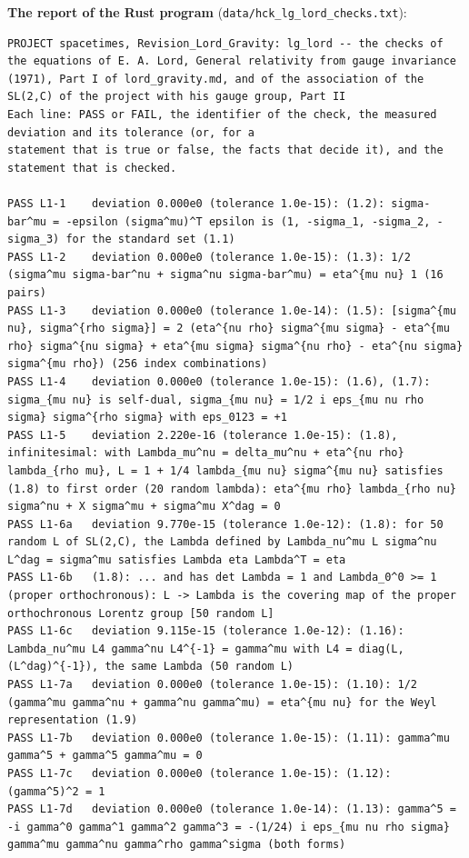 \documentclass[
  10pt,
]{article}
\begin{document}
\textbf{The report of the Rust program}
(\texttt{data/hck\_lg\_lord\_checks.txt}):

\begin{verbatim}
PROJECT spacetimes, Revision_Lord_Gravity: lg_lord -- the checks of the equations of E. A. Lord, General relativity from gauge invariance (1971), Part I of lord_gravity.md, and of the association of the SL(2,C) of the project with his gauge group, Part II
Each line: PASS or FAIL, the identifier of the check, the measured deviation and its tolerance (or, for a
statement that is true or false, the facts that decide it), and the statement that is checked.

PASS L1-1    deviation 0.000e0 (tolerance 1.0e-15): (1.2): sigma-bar^mu = -epsilon (sigma^mu)^T epsilon is (1, -sigma_1, -sigma_2, -sigma_3) for the standard set (1.1)
PASS L1-2    deviation 0.000e0 (tolerance 1.0e-15): (1.3): 1/2 (sigma^mu sigma-bar^nu + sigma^nu sigma-bar^mu) = eta^{mu nu} 1 (16 pairs)
PASS L1-3    deviation 0.000e0 (tolerance 1.0e-14): (1.5): [sigma^{mu nu}, sigma^{rho sigma}] = 2 (eta^{nu rho} sigma^{mu sigma} - eta^{mu rho} sigma^{nu sigma} + eta^{mu sigma} sigma^{nu rho} - eta^{nu sigma} sigma^{mu rho}) (256 index combinations)
PASS L1-4    deviation 0.000e0 (tolerance 1.0e-15): (1.6), (1.7): sigma_{mu nu} is self-dual, sigma_{mu nu} = 1/2 i eps_{mu nu rho sigma} sigma^{rho sigma} with eps_0123 = +1
PASS L1-5    deviation 2.220e-16 (tolerance 1.0e-15): (1.8), infinitesimal: with Lambda_mu^nu = delta_mu^nu + eta^{nu rho} lambda_{rho mu}, L = 1 + 1/4 lambda_{mu nu} sigma^{mu nu} satisfies (1.8) to first order (20 random lambda): eta^{mu rho} lambda_{rho nu} sigma^nu + X sigma^mu + sigma^mu X^dag = 0
PASS L1-6a   deviation 9.770e-15 (tolerance 1.0e-12): (1.8): for 50 random L of SL(2,C), the Lambda defined by Lambda_nu^mu L sigma^nu L^dag = sigma^mu satisfies Lambda eta Lambda^T = eta
PASS L1-6b   (1.8): ... and has det Lambda = 1 and Lambda_0^0 >= 1 (proper orthochronous): L -> Lambda is the covering map of the proper orthochronous Lorentz group [50 random L]
PASS L1-6c   deviation 9.115e-15 (tolerance 1.0e-12): (1.16): Lambda_nu^mu L4 gamma^nu L4^{-1} = gamma^mu with L4 = diag(L, (L^dag)^{-1}), the same Lambda (50 random L)
PASS L1-7a   deviation 0.000e0 (tolerance 1.0e-15): (1.10): 1/2 (gamma^mu gamma^nu + gamma^nu gamma^mu) = eta^{mu nu} for the Weyl representation (1.9)
PASS L1-7b   deviation 0.000e0 (tolerance 1.0e-15): (1.11): gamma^mu gamma^5 + gamma^5 gamma^mu = 0
PASS L1-7c   deviation 0.000e0 (tolerance 1.0e-15): (1.12): (gamma^5)^2 = 1
PASS L1-7d   deviation 0.000e0 (tolerance 1.0e-14): (1.13): gamma^5 = -i gamma^0 gamma^1 gamma^2 gamma^3 = -(1/24) i eps_{mu nu rho sigma} gamma^mu gamma^nu gamma^rho gamma^sigma (both forms)

\end{verbatim}
\end{document}
